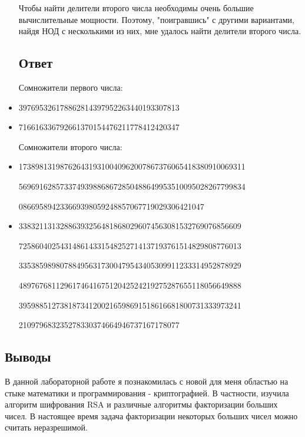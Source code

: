 \documentclass[12pt]{article}
\begin{document}
\begin{itemize}
Чтобы найти делители второго числа необходимы очень большие вычислительные мощности. Поэтому, "поигравшись" с другими вариантами, найдя НОД с несколькими из них, мне удалось найти делители второго числа.

\subsection*{Ответ}
Сомножители первого числа:

\item 397695326178862814397952263440193307813
\item 716616336792661370154476211778412420347

Сомножители второго числа:

\item 1738981319876264319310040962007867376065418380910069311

5696916285733749398868672850488649953510095028267799834

086695894233669398059248857067719029306421047

\item 338321131328863932564818680296074563081532769076856609

725860402543148614331548252714137193761514829808776013

335385989807884956317300479543405309911233314952878929

489767681129617464167512042524219275287655118056649888

395988512738187341200216598691518616681800731333973241

210979683235278330374664946737167178077

\end{itemize}
    
\subsection*{Выводы}

В данной лабораторной работе я познакомилась с новой для меня областью на стыке математики и программирования - криптографией. В частности, изучила алгоритм шифрования RSA и различные алгоритмы факторизации больших чисел. В настоящее время задача факторизации некоторых больших чисел можно считать неразрешимой. 
\end{document}
